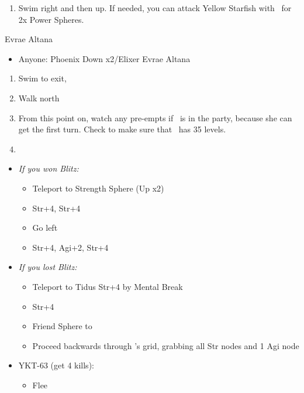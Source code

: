 \begin{enumerate}[resume]
	\item Swim right and then up. If needed, you can attack Yellow Starfish with \tidus\ for 2x Power Spheres.
\end{enumerate}
\begin{battle}{Evrae Altana}
\begin{itemize}
	\item Anyone: Phoenix Down x2/Elixer Evrae Altana
\end{itemize}
\end{battle}
\begin{enumerate}[resume]
	\item Swim to exit, \sd
	\item Walk north
	\item From this point on, watch any pre-empts if \yuna\ is in the party, because she can get the first turn. Check to make sure that \lulu\ has 35 levels.
	\item \formation{\tidus}{\yuna}{\auron}
\end{enumerate}
\begin{spheregrid}
\begin{itemize}
	\yunaf
	\item \textit{If you won Blitz:}
	\begin{itemize}
		\item Teleport to Strength Sphere (Up x2)
		\item Str+4, Str+4
		\item Go left
		\item Str+4, Agi+2, Str+4
	\end{itemize}
	\item \textit{If you lost Blitz:}
	\begin{itemize}
		\item Teleport to Tidus Str+4 by Mental Break
		\item Str+4
		\item Friend Sphere to \tidus
		\item Proceed backwards through \auron's grid, grabbing all Str nodes and 1 Agi node
	\end{itemize}
\end{itemize}
\end{spheregrid}
\begin{encounters}
\begin{itemize}
	\item YKT-63 (get 4 kills):
	\begin{itemize}
		\tidusf Attack
		\yunaf Attack
		\item Flee
	\end{itemize}
\end{itemize}
\end{encounters}
